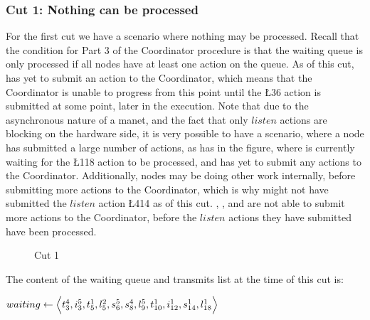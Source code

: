 \subsubsection{Cut 1: Nothing can be processed}
For the first cut we have a scenario where nothing may be processed. Recall that the condition for Part 3 of the Coordinator procedure is that the waiting queue is only processed if all nodes have at least one action on the queue. As of this cut,  has yet to submit an action to the Coordinator, which means that the Coordinator is unable to progress from this point until the \L{3}{6} action is submitted at some point, later in the execution. Note that due to the asynchronous nature of a \gls{manet}, and the fact that only $listen$ actions are blocking on the hardware side, it is very possible to have a scenario, where a node has submitted a large number of actions, as  has in the figure, where  is currently waiting for the \L{1}{18} action to be processed, and  has yet to submit any actions to the Coordinator. Additionally, nodes may be doing other work internally, before submitting more actions to the Coordinator, which is why  might not have submitted the $listen$ action \L{4}{14} as of this cut. , , and  are not able to submit more actions to the Coordinator, before the $listen$ actions they have submitted have been processed.

\begin{figure}[H]
    \centering
    \caption{Cut 1}\label{tikz:coordinatormsc1}
\end{figure}

The content of the waiting queue and transmits list at the time of this cut is: \smallbreak

$waiting \leftarrow \Big\langle%
    \T{4}{3}, %
    \I{5}{3}, %
    \T{1}{5}, %
    \L{2}{5}, %
    \S{5}{6}, %
    \S{4}{8}, %
    \L{5}{9}, %
    \T{1}{10}, %
    \I{1}{12}, %
    \S{1}{14}, %
    \L{1}{18} %
    \Big\rangle$

